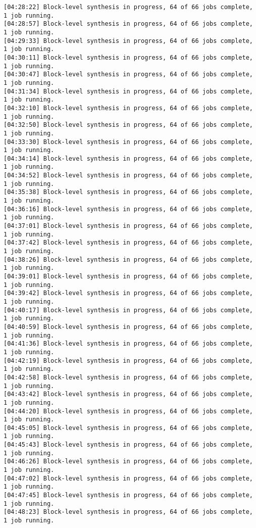 \begin{center}
\begin{lstlisting}[label=lst:vlog,caption=Файл v++\_vinc.log]
[04:28:22] Block-level synthesis in progress, 64 of 66 jobs complete, 1 job running.
[04:28:57] Block-level synthesis in progress, 64 of 66 jobs complete, 1 job running.
[04:29:33] Block-level synthesis in progress, 64 of 66 jobs complete, 1 job running.
[04:30:11] Block-level synthesis in progress, 64 of 66 jobs complete, 1 job running.
[04:30:47] Block-level synthesis in progress, 64 of 66 jobs complete, 1 job running.
[04:31:34] Block-level synthesis in progress, 64 of 66 jobs complete, 1 job running.
[04:32:10] Block-level synthesis in progress, 64 of 66 jobs complete, 1 job running.
[04:32:50] Block-level synthesis in progress, 64 of 66 jobs complete, 1 job running.
[04:33:30] Block-level synthesis in progress, 64 of 66 jobs complete, 1 job running.
[04:34:14] Block-level synthesis in progress, 64 of 66 jobs complete, 1 job running.
[04:34:52] Block-level synthesis in progress, 64 of 66 jobs complete, 1 job running.
[04:35:38] Block-level synthesis in progress, 64 of 66 jobs complete, 1 job running.
[04:36:16] Block-level synthesis in progress, 64 of 66 jobs complete, 1 job running.
[04:37:01] Block-level synthesis in progress, 64 of 66 jobs complete, 1 job running.
[04:37:42] Block-level synthesis in progress, 64 of 66 jobs complete, 1 job running.
[04:38:26] Block-level synthesis in progress, 64 of 66 jobs complete, 1 job running.
[04:39:01] Block-level synthesis in progress, 64 of 66 jobs complete, 1 job running.
[04:39:42] Block-level synthesis in progress, 64 of 66 jobs complete, 1 job running.
[04:40:17] Block-level synthesis in progress, 64 of 66 jobs complete, 1 job running.
[04:40:59] Block-level synthesis in progress, 64 of 66 jobs complete, 1 job running.
[04:41:36] Block-level synthesis in progress, 64 of 66 jobs complete, 1 job running.
[04:42:19] Block-level synthesis in progress, 64 of 66 jobs complete, 1 job running.
[04:42:58] Block-level synthesis in progress, 64 of 66 jobs complete, 1 job running.
[04:43:42] Block-level synthesis in progress, 64 of 66 jobs complete, 1 job running.
[04:44:20] Block-level synthesis in progress, 64 of 66 jobs complete, 1 job running.
[04:45:05] Block-level synthesis in progress, 64 of 66 jobs complete, 1 job running.
[04:45:43] Block-level synthesis in progress, 64 of 66 jobs complete, 1 job running.
[04:46:26] Block-level synthesis in progress, 64 of 66 jobs complete, 1 job running.
[04:47:02] Block-level synthesis in progress, 64 of 66 jobs complete, 1 job running.
[04:47:45] Block-level synthesis in progress, 64 of 66 jobs complete, 1 job running.
[04:48:23] Block-level synthesis in progress, 64 of 66 jobs complete, 1 job running.

\end{lstlisting}
\end{center}
